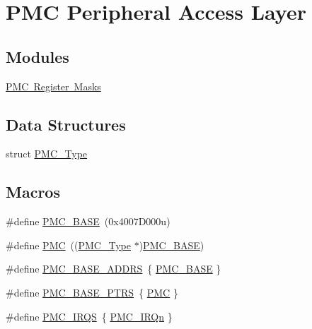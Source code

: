 \hypertarget{group___p_m_c___peripheral___access___layer}{}\section{P\+MC Peripheral Access Layer}
\label{group___p_m_c___peripheral___access___layer}
\subsection*{Modules}
\begin{DoxyCompactItemize}
\item 
\mbox{\hyperlink{group___p_m_c___register___masks}{P\+M\+C Register Masks}}
\end{DoxyCompactItemize}
\subsection*{Data Structures}
\begin{DoxyCompactItemize}
\item 
struct \mbox{\hyperlink{struct_p_m_c___type}{P\+M\+C\+\_\+\+Type}}
\end{DoxyCompactItemize}
\subsection*{Macros}
\begin{DoxyCompactItemize}
\item 
\#define \mbox{\hyperlink{group___p_m_c___peripheral___access___layer_ga4e92bd47dc68cc81e62c344586a4cdfa}{P\+M\+C\+\_\+\+B\+A\+SE}}~(0x4007\+D000u)
\item 
\#define \mbox{\hyperlink{group___p_m_c___peripheral___access___layer_ga979c6d379c67bc2f3e8eb6efcb509f69}{P\+MC}}~((\mbox{\hyperlink{struct_p_m_c___type}{P\+M\+C\+\_\+\+Type}} $\ast$)\mbox{\hyperlink{group___p_m_c___peripheral___access___layer_ga4e92bd47dc68cc81e62c344586a4cdfa}{P\+M\+C\+\_\+\+B\+A\+SE}})
\item 
\#define \mbox{\hyperlink{group___p_m_c___peripheral___access___layer_gab8cb010a2427fcd279c99d0bd4eb809f}{P\+M\+C\+\_\+\+B\+A\+S\+E\+\_\+\+A\+D\+D\+RS}}~\{ \mbox{\hyperlink{group___p_m_c___peripheral___access___layer_ga4e92bd47dc68cc81e62c344586a4cdfa}{P\+M\+C\+\_\+\+B\+A\+SE}} \}
\item 
\#define \mbox{\hyperlink{group___p_m_c___peripheral___access___layer_ga4bcd62643d597f7230f9c1e3d03caaa7}{P\+M\+C\+\_\+\+B\+A\+S\+E\+\_\+\+P\+T\+RS}}~\{ \mbox{\hyperlink{group___p_m_c___peripheral___access___layer_ga979c6d379c67bc2f3e8eb6efcb509f69}{P\+MC}} \}
\item 
\#define \mbox{\hyperlink{group___p_m_c___peripheral___access___layer_ga55eb026c8e8941e1e4d009d8563784b0}{P\+M\+C\+\_\+\+I\+R\+QS}}~\{ \mbox{\hyperlink{group___interrupt__vector__numbers_gga666eb0caeb12ec0e281415592ae89083a713239de483bf25c3b2134414be9faa0}{P\+M\+C\+\_\+\+I\+R\+Qn}} \}
\end{DoxyCompactItemize}


